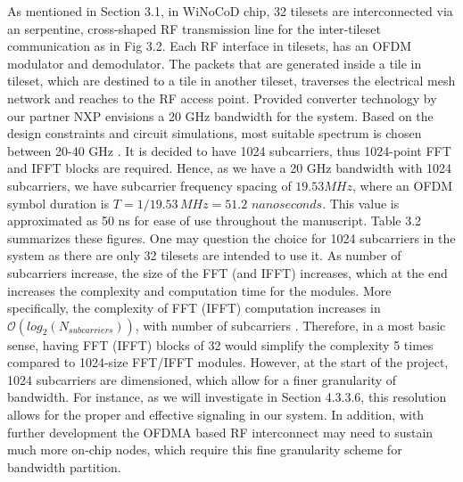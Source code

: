 As mentioned in Section 3.1, in WiNoCoD chip, 32 tilesets are interconnected via an serpentine, cross-shaped RF transmission line for the inter-tileset communication as in Fig 3.2. Each RF interface in tilesets, has an OFDM modulator and demodulator. The packets that are generated inside a tile in tileset, which are destined to a tile in another tileset, traverses the electrical mesh network and reaches to the RF access point. Provided converter technology by our partner NXP envisions a 20 GHz bandwidth for the system. Based on the design constraints and circuit simulations, most suitable spectrum is chosen between 20-40 GHz \cite{hamieh2014sizing}. It is decided to have 1024 subcarriers, thus 1024-point FFT and IFFT blocks are required. Hence, as we have a 20 GHz bandwidth with 1024 subcarriers, we have subcarrier frequency spacing of $19.53 MHz$, where an OFDM symbol duration is $T = 1/19.53 \, MHz = 51.2 \,\, nanoseconds$. This value is approximated as 50 ns for ease of use throughout the manuscript. Table 3.2 summarizes these figures. One may question the choice for 1024 subcarriers in the system as there are only 32 tilesets are intended to use it. As number of subcarriers increase, the size of the FFT (and IFFT) increases, which at the end increases the complexity and computation time for the modules. More specifically, the complexity of FFT (IFFT) computation increases in $\mathcal{O}(log_{2}(N_{subcarriers}))$, with number of subcarriers \cite{hongwei2009fft}. Therefore, in a most basic sense, having FFT (IFFT) blocks of 32 would simplify the complexity 5 times compared to 1024-size FFT/IFFT modules. However, at the start of the project, 1024 subcarriers are dimensioned, which allow for a finer granularity of bandwidth. For instance, as we will investigate in Section 4.3.3.6, this resolution allows for the proper and effective signaling in our system. In addition, with further development the OFDMA based RF interconnect may need to sustain much more on-chip nodes, which require this fine granularity scheme for bandwidth partition.      


